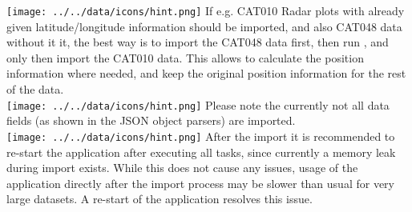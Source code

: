 \texttt{[image: ../../data/icons/hint.png]} If e.g. CAT010 Radar plots with already given latitude/longitude information should be imported, and also CAT048 data without it it, the best way is to import the CAT048 data first, then run , and only then import the CAT010 data. This allows to calculate the position information where needed, and keep the original position information for the rest of the data. \\

\texttt{[image: ../../data/icons/hint.png]} Please note the currently not all data fields (as shown in the JSON object parsers) are imported.\\

\texttt{[image: ../../data/icons/hint.png]} After the import it is recommended to re-start the application after executing all tasks, since currently a memory leak during import exists. While this does not cause any issues, usage of the application directly after the import process may be slower than usual for very large datasets. A re-start of the application resolves this issue. \\ 


